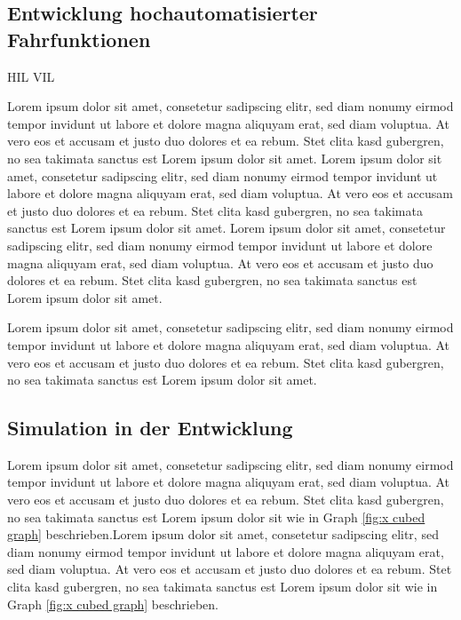 \subsection{Entwicklung hochautomatisierter Fahrfunktionen}
\label{grundlagen_fahren_entwicklung}

HIL VIL

Lorem ipsum dolor sit amet, consetetur sadipscing elitr, sed diam nonumy eirmod tempor invidunt ut labore et dolore magna aliquyam erat, sed diam voluptua. At vero eos et accusam et justo duo dolores et ea rebum. Stet clita kasd gubergren, no sea takimata sanctus est Lorem ipsum dolor sit amet. Lorem ipsum dolor sit amet, consetetur sadipscing elitr, sed diam nonumy eirmod tempor invidunt ut labore et dolore magna aliquyam erat, sed diam voluptua. At vero eos et accusam et justo duo dolores et ea rebum. Stet clita kasd gubergren, no sea takimata sanctus est Lorem ipsum dolor sit amet. Lorem ipsum dolor sit amet, consetetur sadipscing elitr, sed diam nonumy eirmod tempor invidunt ut labore et dolore magna aliquyam erat, sed diam voluptua. At vero eos et accusam et justo duo dolores et ea rebum. Stet clita kasd gubergren, no sea takimata sanctus est Lorem ipsum dolor sit amet.

Lorem ipsum dolor sit amet, consetetur sadipscing elitr, sed diam nonumy eirmod tempor invidunt ut labore et dolore magna aliquyam erat, sed diam voluptua. At vero eos et accusam et justo duo dolores et ea rebum. Stet clita kasd gubergren, no sea takimata sanctus est Lorem ipsum dolor sit amet. 


\subsection{Simulation in der Entwicklung}
\label{grundlagen_fahren_simulation}

Lorem ipsum dolor sit amet, consetetur sadipscing elitr, sed diam nonumy eirmod tempor invidunt ut labore et dolore magna aliquyam erat, sed diam voluptua. At vero eos et accusam et justo duo dolores et ea rebum. Stet clita kasd gubergren, no sea takimata sanctus est Lorem ipsum dolor sit wie in Graph \ref{fig:x cubed graph} beschrieben.Lorem ipsum dolor sit amet, consetetur sadipscing elitr, sed diam nonumy eirmod tempor invidunt ut labore et dolore magna aliquyam erat, sed diam voluptua. At vero eos et accusam et justo duo dolores et ea rebum. Stet clita kasd gubergren, no sea takimata sanctus est Lorem ipsum dolor sit wie in Graph \ref{fig:x cubed graph} beschrieben.

